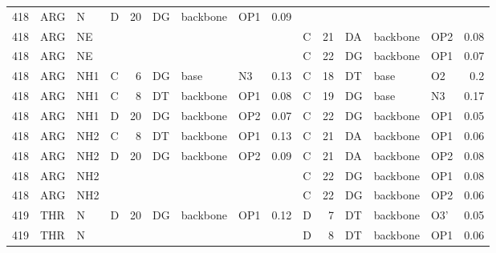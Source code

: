 \begin{longtable}{rlllrlllrlrlllr}
       418 & ARG        & N      & D         &          20 & DG           & backbone    & OP1      &          0.09 &        &          &           &          &       &            \\
       418 & ARG        & NE     &        &          &           &          &       &            & C         &          21 & DA           & backbone    & OP2      &          0.08 \\
       418 & ARG        & NE     &        &          &           &          &       &            & C         &          22 & DG           & backbone    & OP1      &          0.07 \\
       418 & ARG        & NH1    & C         &           6 & DG           & base        & N3       &          0.13 & C         &          18 & DT           & base        & O2       &          0.2  \\
       418 & ARG        & NH1    & C         &           8 & DT           & backbone    & OP1      &          0.08 & C         &          19 & DG           & base        & N3       &          0.17 \\
       418 & ARG        & NH1    & D         &          20 & DG           & backbone    & OP2      &          0.07 & C         &          22 & DG           & backbone    & OP1      &          0.05 \\
       418 & ARG        & NH2    & C         &           8 & DT           & backbone    & OP1      &          0.13 & C         &          21 & DA           & backbone    & OP1      &          0.06 \\
       418 & ARG        & NH2    & D         &          20 & DG           & backbone    & OP2      &          0.09 & C         &          21 & DA           & backbone    & OP2      &          0.08 \\
       418 & ARG        & NH2    &        &          &           &          &       &            & C         &          22 & DG           & backbone    & OP1      &          0.08 \\
       418 & ARG        & NH2    &        &          &           &          &       &            & C         &          22 & DG           & backbone    & OP2      &          0.06 \\
       419 & THR        & N      & D         &          20 & DG           & backbone    & OP1      &          0.12 & D         &           7 & DT           & backbone    & O3'      &          0.05 \\
       419 & THR        & N      &        &          &           &          &       &            & D         &           8 & DT           & backbone    & OP1      &          0.06 \\

\end{longtable}
